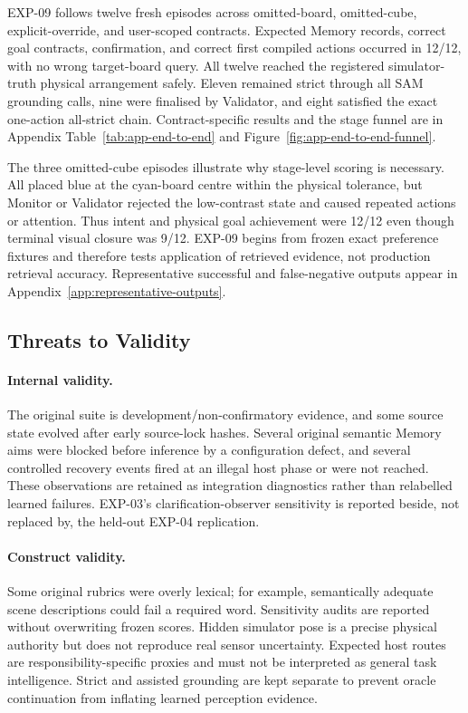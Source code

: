 \documentclass{article}
\begin{document}
EXP-09 follows twelve fresh episodes across omitted-board, omitted-cube,
explicit-override, and user-scoped contracts. Expected Memory records, correct
goal contracts, confirmation, and correct first compiled actions occurred in
12/12, with no wrong target-board query. All twelve reached the registered
simulator-truth physical arrangement safely. Eleven remained strict through
all SAM grounding calls, nine were finalised by Validator, and eight satisfied
the exact one-action all-strict chain. Contract-specific results and the stage
funnel are in Appendix Table~\ref{tab:app-end-to-end} and
Figure~\ref{fig:app-end-to-end-funnel}.

The three omitted-cube episodes illustrate why stage-level scoring is necessary.
All placed blue at the cyan-board centre within the physical tolerance, but
Monitor or Validator rejected the low-contrast state and caused repeated
actions or attention. Thus intent and physical goal achievement were 12/12 even
though terminal visual closure was 9/12. EXP-09 begins from frozen exact
preference fixtures and therefore tests application of retrieved evidence, not
production retrieval accuracy. Representative successful and false-negative
outputs appear in Appendix~\ref{app:representative-outputs}.

\subsection{Threats to Validity}
\label{subsec:evaluation-validity}

\paragraph{Internal validity.}
The original suite is development/non-confirmatory evidence, and some source
state evolved after early source-lock hashes. Several original semantic Memory
aims were blocked before inference by a configuration defect, and several
controlled recovery events fired at an illegal host phase or were not reached.
These observations are retained as integration diagnostics rather than
relabelled learned failures. EXP-03's clarification-observer sensitivity is
reported beside, not replaced by, the held-out EXP-04 replication.

\paragraph{Construct validity.}
Some original rubrics were overly lexical; for example, semantically adequate
scene descriptions could fail a required word. Sensitivity audits are reported
without overwriting frozen scores. Hidden simulator pose is a precise physical
authority but does not reproduce real sensor uncertainty. Expected host routes
are responsibility-specific proxies and must not be interpreted as general
task intelligence. Strict and assisted grounding are kept separate to prevent
oracle continuation from inflating learned perception evidence.
\end{document}
